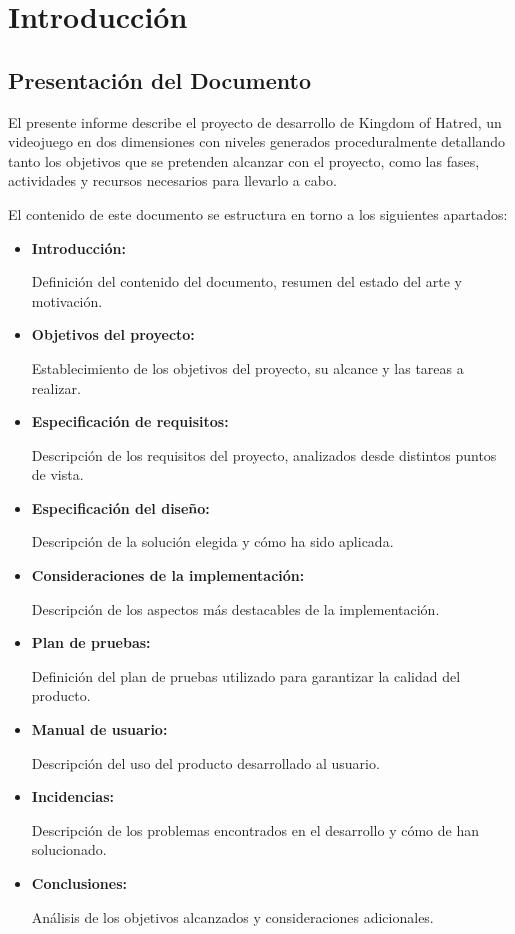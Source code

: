 \chapter{Introducción}\label{cha:introduccion}

\section{Presentación del Documento}

El presente informe describe el proyecto de desarrollo de Kingdom of Hatred, un videojuego en dos dimensiones con niveles generados proceduralmente detallando tanto los objetivos que se pretenden alcanzar con el proyecto, como las fases, actividades y recursos necesarios para llevarlo a cabo.

El contenido de este documento se estructura en torno a los siguientes apartados:

\begin{itemize}
	\item \textbf{Introducción:}
		
	Definición del contenido del documento, resumen del estado del arte y motivación.
	
	\item \textbf{Objetivos del proyecto:}
		
	Establecimiento de los objetivos del proyecto, su alcance y las tareas a realizar.
	
	\item \textbf{Especificación de requisitos:}

	Descripción de los requisitos del proyecto, analizados desde distintos puntos de vista.

	\item \textbf{Especificación del diseño:}
	
	Descripción de la solución elegida y cómo ha sido aplicada.

	\item \textbf{Consideraciones de la implementación:}

	Descripción de los aspectos más destacables de la implementación.

	\item \textbf{Plan de pruebas:}

	Definición del plan de pruebas utilizado para garantizar la calidad del producto.

	\item \textbf{Manual de usuario:}

	Descripción del uso del producto desarrollado al usuario.

	\item \textbf{Incidencias:}

	Descripción de los problemas encontrados en el desarrollo y cómo de han solucionado.

	\item \textbf{Conclusiones:}

	Análisis de los objetivos alcanzados y consideraciones adicionales.
\end{itemize}

